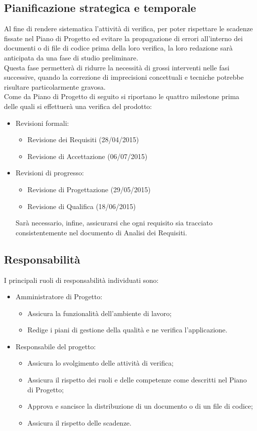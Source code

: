 {\subsection{Pianificazione strategica e temporale}{
	Al fine di rendere sistematica l'attività di verifica, per poter rispettare le scadenze fissate nel Piano di Progetto ed evitare la propagazione di errori all'interno dei documenti o di file di codice prima della loro verifica, la loro redazione sarà anticipata da una fase di studio preliminare. \\
	Questa fase permetterà di ridurre la necessità di grossi interventi nelle fasi successive, quando la correzione di imprecisioni concettuali e tecniche potrebbe risultare particolarmente gravosa. \\
	Come da Piano di Progetto di seguito si riportano le quattro milestone prima delle quali si effettuerà una verifica del prodotto:
	\begin{itemize}
		\item Revisioni formali:
		\begin{itemize}
			\item Revisione dei Requisiti (28/04/2015)
			\item Revisione di Accettazione (06/07/2015)
		\end{itemize}
		\item Revisioni di progresso:
		\begin{itemize}
			\item Revisione di Progettazione (29/05/2015)
			\item Revisione di Qualifica (18/06/2015)
		\end{itemize}
		Sarà necessario, infine, assicurarsi che ogni requisito sia tracciato consistentemente nel documento di Analisi dei Requisiti.
	\end{itemize}
	}
\subsection{Responsabilità}{
I principali ruoli di responsabilità individuati sono:
\begin{itemize}
	\item Amministratore di Progetto:
	\begin{itemize}
		\item Assicura la funzionalità dell'ambiente di lavoro;
		\item Redige i piani di gestione della qualità e ne verifica l'applicazione.
	\end{itemize}
	\item Responsabile del progetto:
	\begin{itemize}
		\item Assicura lo svolgimento delle attività di verifica;
		\item Assicura il rispetto dei ruoli e delle competenze come descritti nel Piano di Progetto;
		\item Approva e sancisce la distribuzione di un documento o di un file di codice;
		\item Assicura il rispetto delle scadenze.
	\end{itemize}
\end{itemize}
}
}
